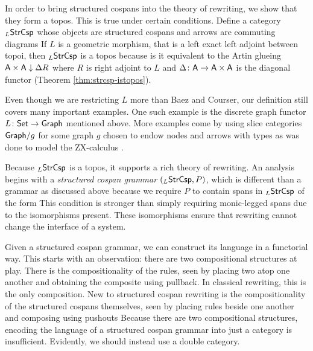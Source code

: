 \documentclass[oneside]{amsart}
\begin{document}
In order to bring structured cospans into the
theory of rewriting, we show that they form a
topos. This is true under certain conditions.
Define a category $ _L\mathsf{StrCsp} $ whose objects are
structured cospans and arrows are commuting
diagrams  If $ L $
is a geometric morphism, that is a left exact left
adjoint between topoi, then $ _L\mathsf{StrCsp} $ is a topos because is
it equivalent to the Artin glueing
$ \mathsf{A} \times \mathsf{A} \downarrow \Delta R $ where $ R $
is right adjoint to $ L $ and
$ \Delta \colon \mathsf{A} \to \mathsf{A} \times \mathsf{A} $ is the
diagonal functor (Theorem \ref{thm:strcsp-istopos}).

Even though we are restricting $ L $ more than
Baez and Courser, our definition still covers many
important examples.  One such example is the
discrete graph functor $ L \colon \mathsf{Set} \to \mathsf{Graph} $
mentioned above. More examples come by using slice
categories $ \mathsf{Graph} / g $ for some graph $ g $
chosen to endow nodes and arrows with types as was
done to model the ZX-calculus \parencite{ZX}.

Because $ _L\mathsf{StrCsp} $ is a topos, it supports a
rich theory of rewriting. An analysis begins with
a \emph{structured cospan grammar}
$ (_L\mathsf{StrCsp}, P) $, which is different than a
grammar as discussed above because we require
$ P $ to contain spans in $ _L\mathsf{StrCsp} $ of the
form  This condition
is stronger than simply requiring monic-legged
spans due to the isomorphisms present. These
isomorphisms ensure that rewriting cannot change
the interface of a system. 

Given a structured cospan grammar, we can
construct its language in a functorial way.  This
starts with an observation: there are two
compositional structures at play. There is the
compositionality of the rules, seen by placing two
atop one another
 and obtaining
the composite 
using pullback. In classical rewriting, this
is the only composition.  New to structured cospan
rewriting is the compositionality of the
structured cospans themselves, seen by placing
rules beside one another
 and composing
using pushouts 
Because there are two compositional structures,
encoding the language of a structured cospan
grammar into just a category is insufficient.
Evidently, we should instead use a double
category.
\end{document}
